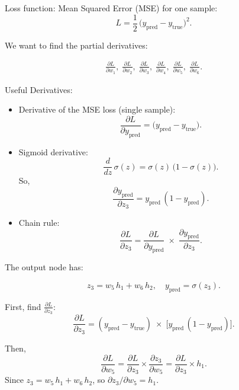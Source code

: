 

  

Loss function: Mean Squared Error (MSE) for one sample:
  \[
    L = \frac{1}{2}\,\bigl(y_{\text{pred}} - y_{\text{true}}\bigr)^2.
  \]

We want to find the partial derivatives:

\begin{align*}
  \frac{\partial L}{\partial w_1},\;
  \frac{\partial L}{\partial w_2},\;
  \frac{\partial L}{\partial w_3},\;
  \frac{\partial L}{\partial w_4},\;
  \frac{\partial L}{\partial w_5},\;
  \frac{\partial L}{\partial w_6}.
\end{align*}


Useful Derivatives:
\begin{itemize}
	\item Derivative of the MSE loss (single sample):
	   \[
		 \frac{\partial L}{\partial y_{\text{pred}}}
		 = \bigl(y_{\text{pred}} - y_{\text{true}}\bigr).
	   \]
	\item Sigmoid derivative:
	   \[
		 \frac{d}{dz}\,\sigma(z) = \sigma(z)\,\bigl(1 - \sigma(z)\bigr).
	   \]
	   So,
	   \[
		 \frac{\partial y_{\text{pred}}}{\partial z_3} 
		 = y_{\text{pred}}\,(1 - y_{\text{pred}}).
	   \]
	\item Chain rule:  
	   \[
		 \frac{\partial L}{\partial z_3}
		 = \frac{\partial L}{\partial y_{\text{pred}}}
		   \;\times\; \frac{\partial y_{\text{pred}}}{\partial z_3}.
	   \]
\end{itemize}

The output node has:

\[
  z_3 = w_5\,h_1 + w_6\,h_2,
  \quad
  y_{\text{pred}} = \sigma(z_3).
\]

First, find \(\frac{\partial L}{\partial z_3}\):  
  \[
    \frac{\partial L}{\partial z_3}
    = (y_{\text{pred}} - y_{\text{true}}) \;\times\; 
      \bigl[y_{\text{pred}}\,(1 - y_{\text{pred}})\bigr].
  \]

Then,
  \[
    \frac{\partial L}{\partial w_5}
    = \frac{\partial L}{\partial z_3} \times \frac{\partial z_3}{\partial w_5}
    = \frac{\partial L}{\partial z_3} \times h_1.
  \]
Since \(z_3 = w_5\,h_1 + w_6\,h_2\), so \(\partial z_3/\partial w_5 = h_1\).

